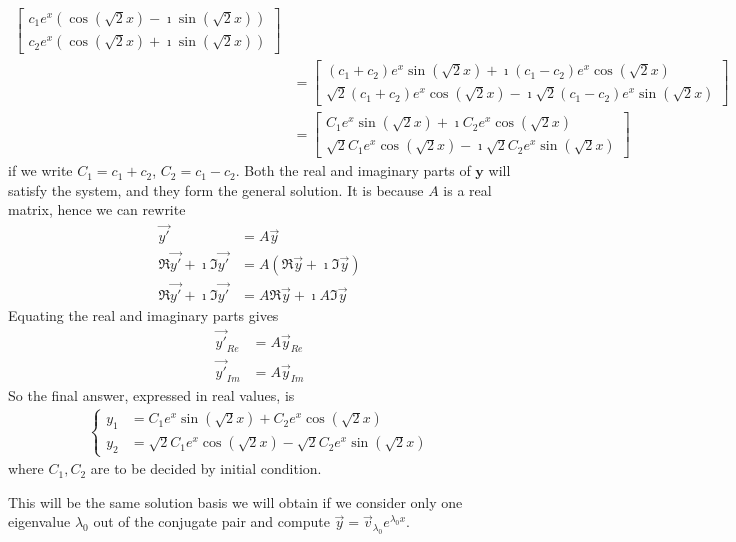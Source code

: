 \begin{exmp}
\begin{align*}
\begin{bmatrix}
c_1e^{x}(\cos(\sqrt{2}x) - \imath\sin(\sqrt{2}x)) \\
c_2e^{x}(\cos(\sqrt{2}x) + \imath\sin(\sqrt{2}x))
\end{bmatrix} \\
&= 
\begin{bmatrix}
(c_1 + c_2)e^{x}\sin(\sqrt{2}x) + \imath(c_1-c_2)e^{x}\cos(\sqrt{2}x) \\
\sqrt{2}(c_1+c_2)e^{x}\cos(\sqrt{2}x) - \imath\sqrt{2}(c_1-c_2)e^{x}\sin(\sqrt{2}x)
\end{bmatrix} \\
&= 
\begin{bmatrix}
C_1e^{x}\sin(\sqrt{2}x) + \imath C_2e^{x}\cos(\sqrt{2}x) \\
\sqrt{2}C_1e^{x}\cos(\sqrt{2}x) - \imath \sqrt{2}C_2e^{x}\sin(\sqrt{2}x)
\end{bmatrix}
\end{align*}
if we write $C_1 = c_1 + c_2$, $C_2 = c_1 - c_2$. Both the real and imaginary parts of $\textbf{y}$ will satisfy the system, and they form the general solution. It is because $A$ is a real matrix, hence we can rewrite
\begin{align*}
\vec{y'} &= A\vec{y} \\
\Re{\vec{y'}} + \imath\Im{\vec{y'}} &= A(\Re{\vec{y}} + \imath\Im{\vec{y}}) \\
\Re{\vec{y'}} + \imath\Im{\vec{y'}} &= A\Re{\vec{y}} + \imath A\Im{\vec{y}}
\end{align*}
Equating the real and imaginary parts gives
\begin{align*}
\vec{y'}_{Re} &= A\vec{y}_{Re} \\
\vec{y'}_{Im} &= A\vec{y}_{Im}
\end{align*}
So the final answer, expressed in real values, is
\begin{align*}
\begin{cases}
y_1 &= C_1e^{x}\sin(\sqrt{2}x) + C_2e^{x}\cos(\sqrt{2}x) \\
y_2 &= \sqrt{2}C_1e^{x}\cos(\sqrt{2}x) - \sqrt{2}C_2e^{x}\sin(\sqrt{2}x)
\end{cases}
\end{align*}
where $C_1, C_2$ are to be decided by initial condition.
\end{exmp}
This will be the same solution basis we will obtain if we consider only one eigenvalue $\lambda_0$ out of the conjugate pair and compute $\vec{y} = \vec{v}_{\lambda_0}e^{\lambda_0 x}$. 

